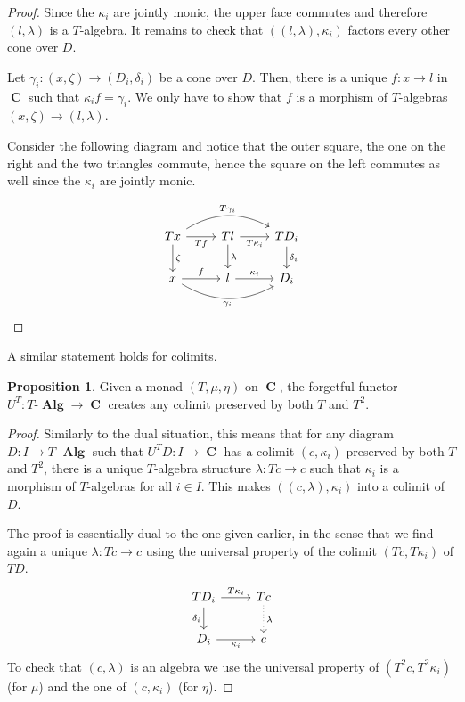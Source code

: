 \documentclass[a4paper,11pt,twoside, openany]{book}
\DeclareMathOperator{\Alg}{\mathbf{Alg}}
\DeclareMathOperator{\C}{\mathbf{C}}
\theoremstyle{definition}
\theoremstyle{definition}
\newtheorem{prop}[thm]{Proposition}
\theoremstyle{remark}
\begin{document}
\begin{proof}
	Since the $\kappa_i$ are jointly monic, the upper face commutes and therefore $(l,\lambda)$ is a $T$-algebra. It remains to check that $((l,\lambda),\kappa_i)$ factors every other cone over $D$.
	
	Let $\gamma_i\colon(x,\zeta)\rightarrow (D_i,\delta_i)$ be a cone over $D$. Then, there is a unique $f\colon x\rightarrow l$ in $\C$ such that $\kappa_if=\gamma_i$. We only have to show that $f$ is a morphism of $T$-algebras $(x,\zeta)\rightarrow (l,\lambda)$.
	
	Consider the following diagram and notice that the outer square, the one on the right and the two triangles commute, hence the square on the left commutes as well since the $\kappa_i$ are jointly monic.
	
	\[
		\begin{tikzcd}
			Tx\ar[rr, bend left, "T\gamma_i"]\ar[r, swap, "Tf"]\ar[d, "\zeta"]
			& Tl\ar[r, swap, "T\kappa_i"]\ar[d, "\lambda"]
			& TD_i\ar[d, "\delta_i"] \\
			x\ar[r, "f"]\ar[rr, bend right, swap, "\gamma_i"]
			& l\ar[r, "\kappa_i"]
			& D_i
		\end{tikzcd}
	\]
\end{proof}

A similar statement holds for colimits.

\begin{prop}\label{create colims}
	Given a monad $(T,\mu,\eta)$ on $\C$, the forgetful functor $U^T\colon T\mbox{-}\Alg\rightarrow\C$ creates any colimit preserved by both $T$ and $T^2$.
\end{prop}

\begin{proof}
	Similarly to the dual situation, this means that for any diagram $D\colon I\rightarrow T\mbox{-}\Alg$ such that $U^TD\colon I\rightarrow\C$ has a colimit $(c,\kappa_i)$ preserved by both $T$ and $T^2$, there is a unique $T$-algebra structure $\lambda\colon Tc\rightarrow c$ such that $\kappa_i$ is a morphism of $T$-algebras for all $i\in I$. This makes $((c,\lambda),\kappa_i)$ into a colimit of $D$.
	
	The proof is essentially dual to the one given earlier, in the sense that we find again a unique $\lambda\colon Tc\rightarrow c$ using the universal property of the colimit $(Tc,T\kappa_i)$ of $TD$.
	\[
		\begin{tikzcd}
			TD_i\ar[r, "T\kappa_i"]\ar[d, "\delta_i"']
			& Tc\ar[d, dotted, "\lambda"] \\
			D_i\ar[r, "\kappa_i"']
			& c
		\end{tikzcd}
	\]
	To check that $(c,\lambda)$ is an algebra we use the universal property of $(T^2c,T^2\kappa_i)$ (for $\mu$) and the one of $(c,\kappa_i)$ (for $\eta$).
\end{proof}
\end{document}
